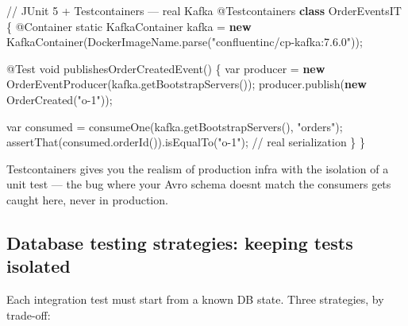 \documentclass[11pt]{article}
\newenvironment{Shaded}{\begin{snugshade}}{\end{snugshade}}
\newcommand{\AttributeTok}[1]{\textcolor[rgb]{0.16,0.50,0.73}{#1}}
\newcommand{\CommentTok}[1]{\textcolor[rgb]{0.48,0.49,0.49}{#1}}
\newcommand{\DataTypeTok}[1]{\textcolor[rgb]{0.16,0.50,0.73}{#1}}
\newcommand{\FunctionTok}[1]{\textcolor[rgb]{0.56,0.27,0.68}{#1}}
\newcommand{\KeywordTok}[1]{\textcolor[rgb]{0.81,0.81,0.76}{\textbf{#1}}}
\newcommand{\NormalTok}[1]{\textcolor[rgb]{0.81,0.81,0.76}{#1}}
\newcommand{\OperatorTok}[1]{\textcolor[rgb]{0.81,0.81,0.76}{#1}}
\newcommand{\StringTok}[1]{\textcolor[rgb]{0.96,0.31,0.31}{#1}}
\begin{document}
\begin{Shaded}
\begin{Highlighting}[]
\CommentTok{// JUnit 5 + Testcontainers — real Kafka}
\AttributeTok{@Testcontainers}
\KeywordTok{class}\NormalTok{ OrderEventsIT }\OperatorTok{\{}
    \AttributeTok{@Container}
    \DataTypeTok{static}\NormalTok{ KafkaContainer kafka }\OperatorTok{=}
        \KeywordTok{new} \FunctionTok{KafkaContainer}\OperatorTok{(}\NormalTok{DockerImageName}\OperatorTok{.}\FunctionTok{parse}\OperatorTok{(}\StringTok{"confluentinc/cp{-}kafka:7.6.0"}\OperatorTok{));}

    \AttributeTok{@Test}
    \DataTypeTok{void} \FunctionTok{publishesOrderCreatedEvent}\OperatorTok{()} \OperatorTok{\{}
        \DataTypeTok{var}\NormalTok{ producer }\OperatorTok{=} \KeywordTok{new} \FunctionTok{OrderEventProducer}\OperatorTok{(}\NormalTok{kafka}\OperatorTok{.}\FunctionTok{getBootstrapServers}\OperatorTok{());}
\NormalTok{        producer}\OperatorTok{.}\FunctionTok{publish}\OperatorTok{(}\KeywordTok{new} \FunctionTok{OrderCreated}\OperatorTok{(}\StringTok{"o{-}1"}\OperatorTok{));}

        \DataTypeTok{var}\NormalTok{ consumed }\OperatorTok{=} \FunctionTok{consumeOne}\OperatorTok{(}\NormalTok{kafka}\OperatorTok{.}\FunctionTok{getBootstrapServers}\OperatorTok{(),} \StringTok{"orders"}\OperatorTok{);}
        \FunctionTok{assertThat}\OperatorTok{(}\NormalTok{consumed}\OperatorTok{.}\FunctionTok{orderId}\OperatorTok{()).}\FunctionTok{isEqualTo}\OperatorTok{(}\StringTok{"o{-}1"}\OperatorTok{);}  \CommentTok{// real serialization}
    \OperatorTok{\}}
\OperatorTok{\}}
\end{Highlighting}
\end{Shaded}

Testcontainers gives you the realism of production infra with the isolation of a unit test --- the bug where your Avro schema doesn\textquotesingle t match the consumer\textquotesingle s gets caught here, never in production.

\subsection{Database testing strategies: keeping tests isolated}\label{database-testing-strategies-keeping-tests-isolated}

Each integration test must start from a known DB state. Three strategies, by trade-off:
\end{document}
